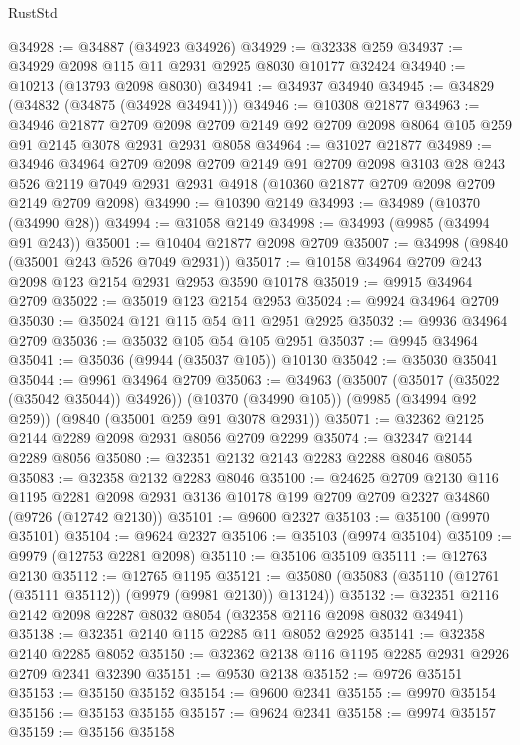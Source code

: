 \begin{lexlean}{RustStd}
\begin{coremodule}
@34928 := @34887 (@34923 @34926)
@34929 := @32338 @259
@34937 := @34929 @2098 @115 @11 @2931 @2925 @8030 @10177 @32424
@34940 := @10213 (@13793 @2098 @8030)
@34941 := @34937 @34940
@34945 := @34829 (@34832 (@34875 (@34928 @34941)))
@34946 := @10308 @21877
@34963 := @34946
    @21877
    @2709
    @2098
    @2709
    @2149
    @92
    @2709
    @2098
    @8064
    @105
    @259
    @91
    @2145
    @3078
    @2931
    @2931
    @8058
@34964 := @31027 @21877
@34989 := @34946
    @34964
    @2709
    @2098
    @2709
    @2149
    @91
    @2709
    @2098
    @3103
    @28
    @243
    @526
    @2119
    @7049
    @2931
    @2931
    @4918
    (@10360 @21877 @2709 @2098 @2709 @2149 @2709 @2098)
@34990 := @10390 @2149
@34993 := @34989 (@10370 (@34990 @28))
@34994 := @31058 @2149
@34998 := @34993 (@9985 (@34994 @91 @243))
@35001 := @10404 @21877 @2098 @2709
@35007 := @34998 (@9840 (@35001 @243 @526 @7049 @2931))
@35017 := @10158 @34964 @2709 @243 @2098 @123 @2154 @2931 @2953 @3590 @10178
@35019 := @9915 @34964 @2709
@35022 := @35019 @123 @2154 @2953
@35024 := @9924 @34964 @2709
@35030 := @35024 @121 @115 @54 @11 @2951 @2925
@35032 := @9936 @34964 @2709
@35036 := @35032 @105 @54 @105 @2951
@35037 := @9945 @34964
@35041 := @35036 (@9944 (@35037 @105)) @10130
@35042 := @35030 @35041
@35044 := @9961 @34964 @2709
@35063 := @34963
    (@35007 (@35017 (@35022 (@35042 @35044)) @34926))
    (@10370 (@34990 @105))
    (@9985 (@34994 @92 @259))
    (@9840 (@35001 @259 @91 @3078 @2931))
@35071 := @32362 @2125 @2144 @2289 @2098 @2931 @8056 @2709 @2299
@35074 := @32347 @2144 @2289 @8056
@35080 := @32351 @2132 @2143 @2283 @2288 @8046 @8055
@35083 := @32358 @2132 @2283 @8046
@35100 := @24625
    @2709
    @2130
    @116
    @1195
    @2281
    @2098
    @2931
    @3136
    @10178
    @199
    @2709
    @2709
    @2327
    @34860
    (@9726 (@12742 @2130))
@35101 := @9600 @2327
@35103 := @35100 (@9970 @35101)
@35104 := @9624 @2327
@35106 := @35103 (@9974 @35104)
@35109 := @9979 (@12753 @2281 @2098)
@35110 := @35106 @35109
@35111 := @12763 @2130
@35112 := @12765 @1195
@35121 := @35080 (@35083 (@35110 (@12761 (@35111 @35112)) (@9979 (@9981 @2130)) @13124))
@35132 := @32351 @2116 @2142 @2098 @2287 @8032 @8054 (@32358 @2116 @2098 @8032 @34941)
@35138 := @32351 @2140 @115 @2285 @11 @8052 @2925
@35141 := @32358 @2140 @2285 @8052
@35150 := @32362 @2138 @116 @1195 @2285 @2931 @2926 @2709 @2341 @32390
@35151 := @9530 @2138
@35152 := @9726 @35151
@35153 := @35150 @35152
@35154 := @9600 @2341
@35155 := @9970 @35154
@35156 := @35153 @35155
@35157 := @9624 @2341
@35158 := @9974 @35157
@35159 := @35156 @35158

\end{coremodule}
\end{lexlean}
